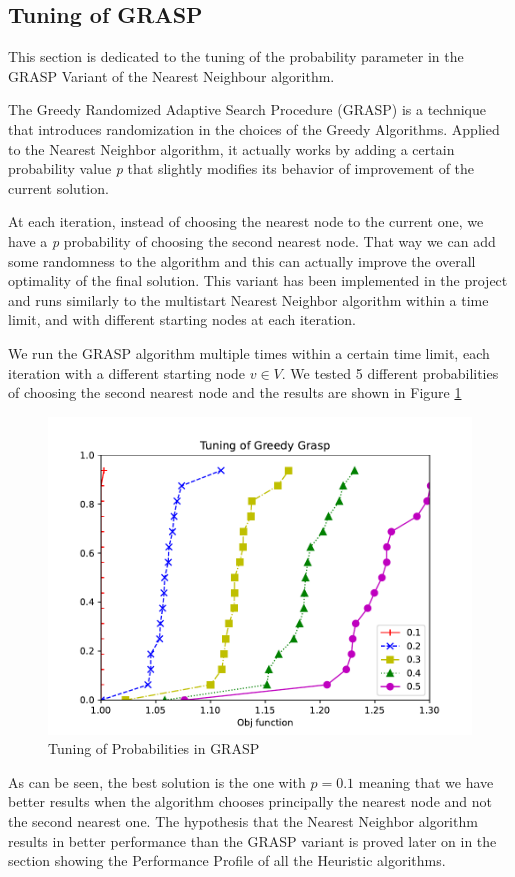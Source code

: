 \subsection{Tuning of GRASP}
This section is dedicated to the tuning of the probability parameter in the GRASP Variant of the Nearest Neighbour algorithm.

The Greedy Randomized Adaptive Search Procedure (GRASP) is a technique that introduces randomization in the choices of the Greedy Algorithms.
Applied to the Nearest Neighbor algorithm, it actually works by adding a certain probability value \textit{p} that slightly modifies its behavior of improvement of the current solution.

At each iteration, instead of choosing the nearest node to the current one, we have a \textit{p} probability of choosing the second nearest node. That way we can add some randomness to the algorithm and this can actually improve the overall optimality of the final solution.
This variant has been implemented in the project and runs similarly to the multistart Nearest Neighbor algorithm within a time limit, and with different starting nodes at each iteration.

We run the GRASP algorithm multiple times within a certain time limit, each iteration with a different starting node $v \in V$. We tested 5 different probabilities of choosing the second nearest node and the results are shown in Figure \ref{fig:grasp}

\begin{figure}[!h]
    \centering
    \includegraphics[width=\textwidth]{images/grasp.pdf}
    \caption{Tuning of Probabilities in GRASP}
    \label{fig:grasp}
\end{figure}

As can be seen, the best solution is the one with $p = 0.1$ meaning that we have better results when the algorithm chooses principally the nearest node and not the second nearest one. The hypothesis that the Nearest Neighbor algorithm results in better performance than the GRASP variant is proved later on in the section showing the Performance Profile of all the Heuristic algorithms.


